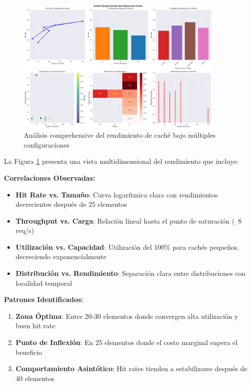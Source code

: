 \documentclass[12pt,a4paper]{article}
\begin{document}
\begin{figure}[H]
\centering
\includegraphics[width=0.9\textwidth]{cache_analysis_comprehensive.png}
\caption{Análisis comprehensive del rendimiento de caché bajo múltiples configuraciones}
\label{fig:cache_comprehensive}
\end{figure}

La Figura \ref{fig:cache_comprehensive} presenta una vista multidimensional del rendimiento que incluye:

\textbf{Correlaciones Observadas:}
\begin{itemize}
\item \textbf{Hit Rate vs. Tamaño}: Curva logarítmica clara con rendimientos decrecientes después de 25 elementos
\item \textbf{Throughput vs. Carga}: Relación lineal hasta el punto de saturación (~8 req/s)
\item \textbf{Utilización vs. Capacidad}: Utilización del 100\% para cachés pequeños, decreciendo exponencialmente
\item \textbf{Distribución vs. Rendimiento}: Separación clara entre distribuciones con localidad temporal
\end{itemize}

\textbf{Patrones Identificados:}
\begin{enumerate}
\item \textbf{Zona Óptima}: Entre 20-30 elementos donde convergen alta utilización y buen hit rate
\item \textbf{Punto de Inflexión}: En 25 elementos donde el costo marginal supera el beneficio
\item \textbf{Comportamiento Asintótico}: Hit rates tienden a estabilizarse después de 40 elementos
\end{enumerate}
\end{document}

